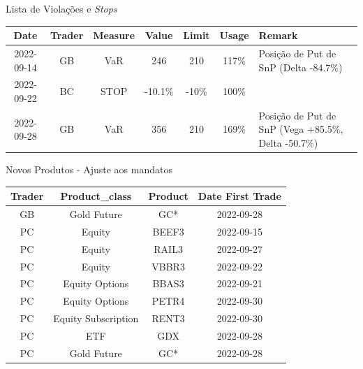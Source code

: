 \documentclass[t,aspectratio=169]{beamer}
\begin{document}
\begin{frame}{Lista de Violações e \textit{Stops}}
\begin{table}
	\scriptsize
	\begin{tabular}{|c|c|c|c|c|c|l|}
		\hline
		\textbf{Date} & \textbf{Trader} & \textbf{Measure} & \textbf{Value} & \textbf{Limit} & \textbf{Usage} & \textbf{Remark}                                            \\ \hline
		2022-09-14    & GB      & VaR              & 246            & 210     & {\color{red} 117\%}           & Posição de Put de SnP (Delta -84.7\%)                    \\ \hline
		2022-09-22    & BC      & STOP             & -10.1\%        & -10\%    & {\color{red} 100\%}        & {}                                                            \\ \hline
		2022-09-28    & GB              & VaR              & 356           & 210     & {\color{red} 169\%}        & Posição de Put de SnP (Vega +85.5\%, Delta -50.7\%) \\ \hline
	\end{tabular}
\end{table}	
\end{frame}


\begin{frame}{Novos Produtos - Ajuste aos mandatos}
	\begin{table}
		\scriptsize
\begin{tabular}{|c|c|c|c|}
	\hline
	\textbf{Trader} & \textbf{Product\_class} & \textbf{Product} & \textbf{Date First Trade} \\ \hline
	GB & Gold Future         & GC*     & 2022-09-28 \\ \hline
	PC & Equity              & BEEF3 & 2022-09-15 \\ \hline
	PC & Equity              & RAIL3 & 2022-09-27 \\ \hline
	PC & Equity              & VBBR3 & 2022-09-22 \\ \hline
	PC & Equity Options      & BBAS3 & 2022-09-21 \\ \hline
	PC & Equity Options      & PETR4 & 2022-09-30 \\ \hline
	PC & Equity Subscription & RENT3 & 2022-09-30 \\ \hline
	PC & ETF                 & GDX   & 2022-09-28 \\ \hline
	PC & Gold Future         & GC*     & 2022-09-28 \\ \hline
\end{tabular}
	 
	\end{table}	
\end{frame}
\end{document}
